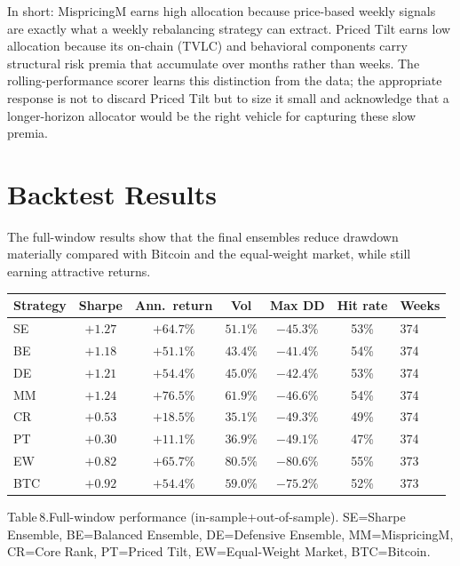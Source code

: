\documentclass[11pt,a4paper]{article}
\begin{document}
\begin{callout} [title=Why MispricingM dominates and Priced Tilt shrinks]
In short: MispricingM earns high allocation because price-based weekly signals are exactly what a weekly rebalancing strategy can extract. Priced Tilt earns low allocation because its on-chain (TVLC) and behavioral components carry structural risk premia that accumulate over months rather than weeks. The rolling-performance scorer learns this distinction from the data; the appropriate response is not to discard Priced Tilt but to size it small and acknowledge that a longer-horizon allocator would be the right vehicle for capturing these slow premia.
\end{callout}

\newpage
\section{Backtest Results}

The full-window results show that the final ensembles reduce drawdown materially compared with Bitcoin and the equal-weight market, while still earning attractive returns.

\begin{center}
\small
\begin{tabular}{lcccccl}
\toprule
\rowcolor{tablehead}
\textbf{Strategy} & \textbf{Sharpe} & \textbf{Ann.\ return} & \textbf{Vol} & \textbf{Max DD} & \textbf{Hit rate} & \textbf{Weeks} \\
\midrule
SE  & $+1.27$ & $+64.7\%$ & $51.1\%$ & $-45.3\%$ & 53\% & 374 \\
BE  & $+1.18$ & $+51.1\%$ & $43.4\%$ & $-41.4\%$ & 54\% & 374 \\
DE  & $+1.21$ & $+54.4\%$ & $45.0\%$ & $-42.4\%$ & 53\% & 374 \\
MM  & $+1.24$ & $+76.5\%$ & $61.9\%$ & $-46.6\%$ & 54\% & 374 \\
CR  & $+0.53$ & $+18.5\%$ & $35.1\%$ & $-49.3\%$ & 49\% & 374 \\
PT  & $+0.30$ & $+11.1\%$ & $36.9\%$ & $-49.1\%$ & 47\% & 374 \\
EW  & $+0.82$ & $+65.7\%$ & $80.5\%$ & $-80.6\%$ & 55\% & 373 \\
BTC & $+0.92$ & $+54.4\%$ & $59.0\%$ & $-75.2\%$ & 52\% & 373 \\
\bottomrule
\end{tabular}
\end{center}
\smallskip
{\small Table\,8.\;Full-window performance (in-sample\;+\;out-of-sample). SE\;=\;Sharpe Ensemble, BE\;=\;Balanced Ensemble, DE\;=\;Defensive Ensemble, MM\;=\;MispricingM, CR\;=\;Core Rank, PT\;=\;Priced Tilt, EW\;=\;Equal-Weight Market, BTC\;=\;Bitcoin.}
\end{document}
